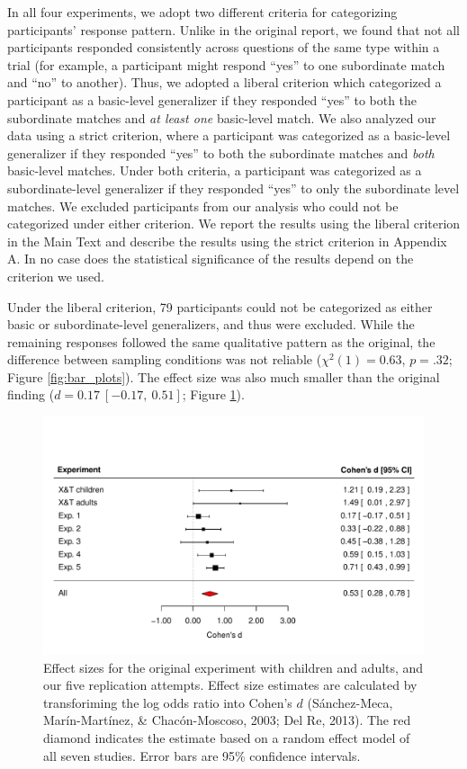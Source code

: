 \documentclass[man]{apa2}
\begin{document}
In all four experiments, we adopt two different criteria for categorizing participants' response pattern. Unlike in the original report, we found that not all participants responded consistently across questions of the same type within a trial (for example, a participant might respond ``yes'' to one subordinate match and ``no'' to another). Thus, we adopted a liberal criterion which categorized a participant as a basic-level generalizer if they responded ``yes'' to both the subordinate matches and {\it at least one} basic-level match. We also analyzed our data using a strict criterion, where a participant was categorized as a basic-level generalizer if they responded ``yes'' to both the subordinate matches and {\it both} basic-level matches. Under both criteria, a participant was categorized as a subordinate-level generalizer if they responded ``yes'' to only the subordinate level matches. We excluded participants from our analysis who could not be categorized under either criterion. We report the results using the liberal criterion in the Main Text and describe the results using the strict criterion in Appendix A. In no case does the statistical significance of the results depend on the criterion we used. 

Under the liberal criterion, 79 participants could not be categorized as either basic or subordinate-level generalizers, and thus were excluded. While the remaining responses followed the same qualitative pattern as the original, the difference between sampling conditions was not reliable ($\chi^2(1) = 0.63$, $p = .32$; Figure \ref{fig:bar_plots}). The effect size was also much smaller than the original finding ($d = 0.17\ [-0.17,\ 0.51]$; Figure \ref{fig:effect_sizes}).

\begin{figure} [t]
  \centering
  \includegraphics[width=6in]{figures/FIG_3.pdf} 
  \caption{\label{fig:effect_sizes} Effect sizes for the original experiment with children and adults, and our five replication attempts. Effect size estimates are calculated  by transforiming the log odds ratio into Cohen's $d$ (S\'{a}nchez-Meca, Mar\'{i}n-Mart\'{i}nez, \& Chac\'{o}n-Moscoso, 2003; Del Re, 2013). The red diamond indicates the estimate based on a random effect model of all seven studies. Error bars are 95\% confidence intervals.} 
\end{figure}
\end{document}
